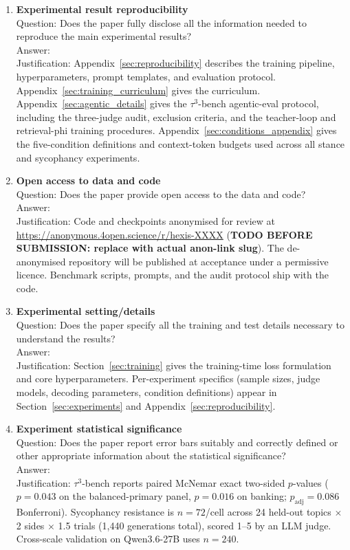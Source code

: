 \begin{enumerate}
\item {\bf Experimental result reproducibility}\\
    Question: Does the paper fully disclose all the information needed to
    reproduce the main experimental results?\\
    Answer: \answerYes{}\\
    Justification: Appendix~\ref{sec:reproducibility} describes the training
    pipeline, hyperparameters, prompt templates, and evaluation protocol.
    Appendix~\ref{sec:training_curriculum} gives the curriculum.
    Appendix~\ref{sec:agentic_details} gives the $\tau^3$-bench agentic-eval
    protocol, including the three-judge audit, exclusion criteria, and the
    teacher-loop and retrieval-phi training procedures.
    Appendix~\ref{sec:conditions_appendix} gives the five-condition
    definitions and context-token budgets used across all stance and
    sycophancy experiments.

\item {\bf Open access to data and code}\\
    Question: Does the paper provide open access to the data and code?\\
    Answer: \answerYes{}\\
    Justification: Code and checkpoints anonymised for review at
    \url{https://anonymous.4open.science/r/hexis-XXXX}
    (\textbf{TODO BEFORE SUBMISSION: replace with actual anon-link slug}).
    The de-anonymised repository will be published at acceptance under a
    permissive licence. Benchmark scripts, prompts, and the audit protocol
    ship with the code.

\item {\bf Experimental setting/details}\\
    Question: Does the paper specify all the training and test details
    necessary to understand the results?\\
    Answer: \answerYes{}\\
    Justification: Section~\ref{sec:training} gives the training-time loss
    formulation and core hyperparameters. Per-experiment specifics (sample
    sizes, judge models, decoding parameters, condition definitions) appear
    in Section~\ref{sec:experiments} and Appendix~\ref{sec:reproducibility}.

\item {\bf Experiment statistical significance}\\
    Question: Does the paper report error bars suitably and correctly defined
    or other appropriate information about the statistical significance?\\
    Answer: \answerYes{}\\
    Justification: $\tau^3$-bench reports paired McNemar exact two-sided
    $p$-values ($p{=}0.043$ on the balanced-primary panel, $p{=}0.016$ on
    banking; $p_{\text{adj}}{=}0.086$ Bonferroni). Sycophancy resistance is
    $n{=}72$/cell across 24 held-out topics $\times$ 2 sides $\times$ 1.5
    trials (1{,}440 generations total), scored 1--5 by an LLM judge.
    Cross-scale validation on Qwen3.6-27B uses $n{=}240$.


\end{enumerate}

